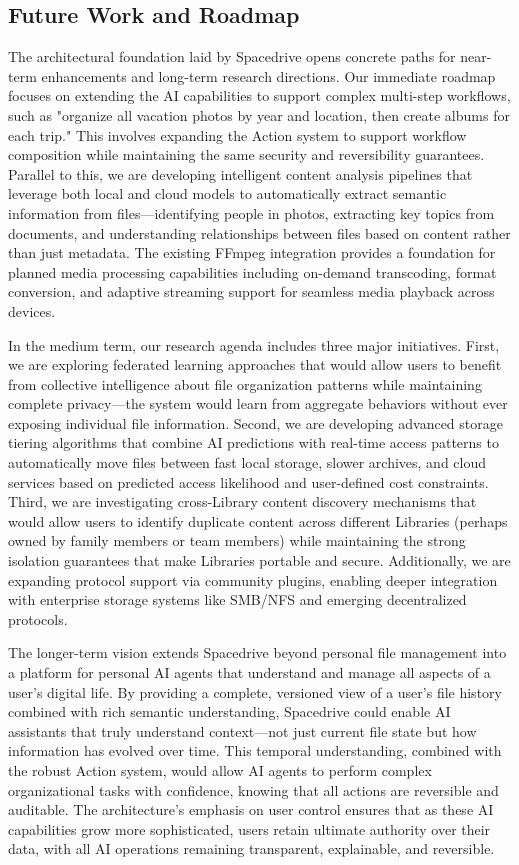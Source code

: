 \documentclass[sigconf]{acmart}
\begin{document}
\subsection{Future Work and Roadmap}
The architectural foundation laid by Spacedrive opens concrete paths for near-term enhancements and long-term research directions. Our immediate roadmap focuses on extending the AI capabilities to support complex multi-step workflows, such as "organize all vacation photos by year and location, then create albums for each trip." This involves expanding the Action system to support workflow composition while maintaining the same security and reversibility guarantees. Parallel to this, we are developing intelligent content analysis pipelines that leverage both local and cloud models to automatically extract semantic information from files---identifying people in photos, extracting key topics from documents, and understanding relationships between files based on content rather than just metadata. The existing FFmpeg integration provides a foundation for planned media processing capabilities including on-demand transcoding, format conversion, and adaptive streaming support for seamless media playback across devices.

In the medium term, our research agenda includes three major initiatives. First, we are exploring federated learning approaches that would allow users to benefit from collective intelligence about file organization patterns while maintaining complete privacy---the system would learn from aggregate behaviors without ever exposing individual file information. Second, we are developing advanced storage tiering algorithms that combine AI predictions with real-time access patterns to automatically move files between fast local storage, slower archives, and cloud services based on predicted access likelihood and user-defined cost constraints. Third, we are investigating cross-Library content discovery mechanisms that would allow users to identify duplicate content across different Libraries (perhaps owned by family members or team members) while maintaining the strong isolation guarantees that make Libraries portable and secure. Additionally, we are expanding protocol support via community plugins, enabling deeper integration with enterprise storage systems like SMB/NFS and emerging decentralized protocols.

The longer-term vision extends Spacedrive beyond personal file management into a platform for personal AI agents that understand and manage all aspects of a user's digital life. By providing a complete, versioned view of a user's file history combined with rich semantic understanding, Spacedrive could enable AI assistants that truly understand context---not just current file state but how information has evolved over time. This temporal understanding, combined with the robust Action system, would allow AI agents to perform complex organizational tasks with confidence, knowing that all actions are reversible and auditable. The architecture's emphasis on user control ensures that as these AI capabilities grow more sophisticated, users retain ultimate authority over their data, with all AI operations remaining transparent, explainable, and reversible.
\end{document}
